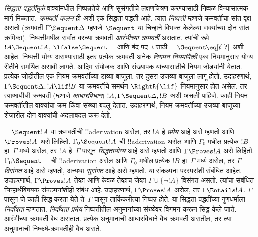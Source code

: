 \emph{सिद्धता-पद्धतींमुळे} वाक्यांमधील निष्पन्नतेचे आणि सुसंगतीचे लक्षणचित्रण करण्यासाठी निव्वळ विन्यासात्मक मार्ग मिळतात. \emph{क्रमवर्ती कलन} ही अशी एक सिद्धता-पद्धती आहे. त्यात \emph{निष्पत्ती} म्हणजे क्रमवर्तींचा सांत वृक्ष असतो (क्रमवर्ती $\Gamma \Sequent \Delta$ म्हणजे~$\Sequent$ या चिन्हाने विभक्त केलेल्या वाक्यांच्या दोन सांत क्रमिका). निष्पत्तीमधील सर्वांत वरच्या क्रमवर्ती \emph{आरंभीच्या क्रमवर्ती} असतात. त्यांची रूपे $!A \Sequent !A$, $\lfalse \Sequent \quad$ आणि बंद पद~$t$ साठी $\quad \Sequent \eq[t][t]$ अशी आहेत. निष्पत्ती योग्य असण्यासाठी इतर प्रत्येक क्रमवर्ती अनेक \emph{निगमन नियमांपैकी} एका नियमानुसार योग्य रीतीने समर्थित असावी लागते. आदिम संयोजक आणि संख्यापक यांच्यासाठीचे नियम जोड्यांनी येतात. प्रत्येक जोडीतील एक नियम क्रमवर्तीच्या डाव्या बाजूला, तर दुसरा उजव्या बाजूला लागू होतो. उदाहरणार्थ, $\Gamma \Sequent \Delta, !A \lif !B$ या क्रमवर्तीचे समर्थन $\RightR{\lif}$ नियमानुसार होत असेल, तर त्याआधीची क्रमवर्ती (म्हणजे \emph{आधारविधान}) $!A, \Gamma \Sequent \Delta, !B$ अशी असली पाहिजे. काही नियम क्रमवर्तीतील वाक्यांचा क्रम किंवा संख्या बदलू देतात. उदाहरणार्थ, \RightR{\Exchange} नियम क्रमवर्तीच्या उजव्या बाजूच्या शेजारील दोन वाक्यांची अदलाबदल करू देतो.

$\quad \Sequent !A$ या क्रमवर्तीची !!a{derivation} असेल, तर $!A$ हे \emph{प्रमेय} आहे असे म्हणतो आणि~$\Proves !A$ असे लिहितो. $\Gamma_0 \Sequent !A$ ची !!a{derivation} असेल आणि $\Gamma_0$ मधील प्रत्येक $!B$ हा~$\Gamma$ मध्ये असेल, तर $!A$ हे~$\Gamma$ पासून \emph{सिद्धतायोग्य} आहे असे म्हणतो आणि $\Gamma \Proves !A$ असे लिहितो. $\Gamma_0 \Sequent \quad$ ची !!a{derivation} असेल आणि $\Gamma_0$ मधील प्रत्येक $!B$ हा~$\Gamma$ मध्ये असेल, तर $\Gamma$ \emph{विसंगत} आहे असे म्हणतो, अन्यथा \emph{सुसंगत} आहे असे म्हणतो. या संकल्पना परस्परांशी संबंधित आहेत. उदाहरणार्थ, $\Gamma \Proves !A$ तेव्हा आणि केवळ तेव्हाच जेव्हा $\Gamma \cup \{\lnot !A\}$ विसंगत असतो. त्यांचा संबंधित चिन्हार्थविषयक संकल्पनांशीही संबंध आहे. उदाहरणार्थ, $\Gamma \Proves !A$ असेल, तर $\Gamma \Entails !A$. $\Gamma$ पासून जे काही सिद्ध करता येते ते~$\Gamma$ पासून तार्किकरीत्या निष्पन्न होते, या सिद्धता-पद्धतींच्या गुणधर्माला \emph{निर्दोषता} म्हणतात. \emph{निर्दोषता प्रमेय} निष्पत्तीतील अनुमानांच्या संख्येवर विगमन करून सिद्ध केले जाते. आरंभीच्या क्रमवर्ती वैध असतात. प्रत्येक अनुमानाची आधारविधाने वैध क्रमवर्ती असतील, तर त्या अनुमानाची निष्कर्ष-क्रमवर्तीही वैध असते.
